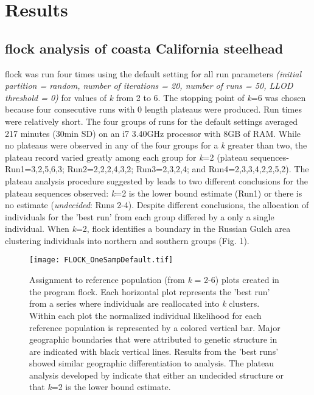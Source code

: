 \section*{Results}

\subsection*{{\sc flock} analysis of coasta California steelhead} 
{\sc flock} was run four times using the default setting for all run parameters \textit{(initial partition = random, number of iterations = 20, number of runs = 50, LLOD threshold = 0)} for values of \textit{k} from 2 to 6. The stopping point of \textit{k}=6 was chosen because four consecutive runs with 0 length plateaus were produced. 
Run times were relatively short. The four groups of runs for the default settings averaged 217 minutes (30min SD) on an i7 3.40GHz processor with 8GB of RAM. While no plateaus were observed in any of the four groups for a \textit{k} greater than two, the plateau record varied greatly among each group for \textit{k}=2 (plateau sequences- Run1=3,2,5,6,3; Run2=2,2,2,4,3,2; Run3=2,3,2,4; and Run4=2,3,3,4,2,2,5,2). The plateau analysis procedure suggested by \citet{Duc&Tur2012} leads to two different conclusions for the plateau sequences observed: \textit{k}=2 is the lower bound estimate (Run1) or there is no estimate (\textit{undecided}: Runs 2-4). Despite different conclusions, the allocation of individuals for the 'best run' from each group differed by a only a single individual. When \textit{k}=2, {\sc flock} identifies a boundary in the Russian Gulch area clustering individuals into northern and southern groups (Fig. 1). 

\begin{figure}
    \texttt{[image: FLOCK\_OneSampDefault.tif]}
    \caption{Assignment to reference population (from \textit{k} = 2-6) plots created in the program {\sc flock}. Each horizontal plot represents the 'best run' from a series where individuals are reallocated into \textit{k} clusters. Within each plot the normalized individual likelihood for each reference population is represented by a colored vertical bar. Major geographic boundaries that were attributed to genetic structure in \citet{Garzaetal_norcal} are indicated with black vertical lines. Results from the 'best runs' showed similar geographic differentiation to \citet{Garzaetal_norcal} analysis. The plateau analysis developed by \citet{Duc&Tur2012} indicate that either an undecided structure or that \textit{k}=2 is the lower bound estimate.}
    \label{Fig.1}
\end{figure}

